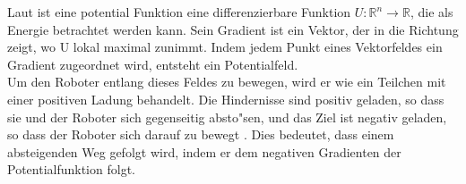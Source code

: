 Laut \cite{Principles:05} ist eine potential Funktion eine differenzierbare Funktion $U : \mathbb{R}^{n} \rightarrow \mathbb{R}$, die als Energie betrachtet werden kann. Sein Gradient ist ein Vektor, der in die Richtung zeigt, wo U lokal maximal zunimmt. Indem jedem Punkt eines Vektorfeldes ein Gradient zugeordnet wird, entsteht ein Potentialfeld.\\
Um den Roboter entlang dieses Feldes zu bewegen, wird er wie ein Teilchen mit einer positiven Ladung behandelt. Die Hindernisse sind positiv geladen, so dass sie und der Roboter sich gegenseitig absto{"s}en, und das Ziel ist negativ geladen, so dass der Roboter sich darauf zu bewegt \cite{Yong:92}. Dies bedeutet, dass einem absteigenden Weg gefolgt wird, indem er dem negativen Gradienten der Potentialfunktion folgt.


